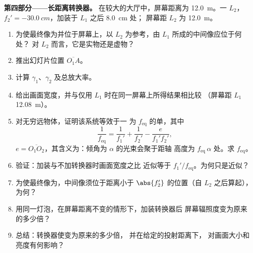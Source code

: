 \begin{problem}
\medskip
\noindent\textbf{第四部分——长距离转换器。}
在较大的大厅中，屏幕距离为 \qty{12.0}{m}。一
$L_2$，$f_2' = \qty{-30.0}{cm}$，加装于 $L_1$ 之后 \qty{8.0}{cm} 处；
屏幕距 $L_2$ 为 \qty{12.0}{m}。
\begin{enumerate}[resume]
  \item 为使最终像为并位于屏幕上，以
        $L_2$ 为参考，由 $L_1$ 所成的中间像应位于何处？
        对 $L_2$ 而言，它是实物还是虚物？
  \item 推出幻灯片位置 $\overline{O_1A}$。
  \item 计算 $\gamma_1$、$\gamma_2$ 及总放大率。
  \item 给出画面宽度，并与仅用 $L_1$ 时在同一屏幕上所得结果相比较
        （屏幕距 $L_1$ \qty{12.08}{m}）。
  \item 对无穷远物体，证明该系统等效于一
        为 $f_{\mathrm{eq}}$ 的单，其中
        \[
        \frac{1}{f_{\mathrm{eq}}} = \frac{1}{f_1'} + \frac{1}{f_2'} - \frac{e}{f_1' f_2'},
        \]
        $e = \overline{O_1O_2}$，其含义为：倾角为
        $\alpha$ 的光束会聚于距轴
        高度为 $f_{\mathrm{eq}}\,\alpha$ 处。求 $f_{\mathrm{eq}}$。
  \item 验证：加装与不加转换器时画面宽度之比
        近似等于 $f_1'/f_{\mathrm{eq}}$。为何只是近似？
  \item 为使最终像为，中间像须位于距离小于 $\abs{f_2'}$
        的位置（自 $L_2$ 之后算起），为何？
  \item 用同一灯泡，在屏幕距离不变的情形下，加装转换器后
        屏幕辐照度变为原来的多少倍？
  \item 总结：转换器使变为原来的多少倍，
        并在给定的投射距离下，
        对画面大小和亮度有何影响？
\end{enumerate}
\end{problem}
